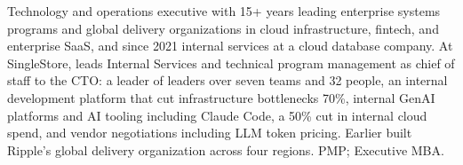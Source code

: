 \documentclass[11pt,letterpaper,sans]{moderncv}
\begin{document}
\makecvtitle




\vspace{6pt}
\small{Technology and operations executive with 15+ years leading enterprise systems programs and global delivery organizations in cloud infrastructure, fintech, and enterprise SaaS, and since 2021 internal services at a cloud database company. At SingleStore, leads Internal Services and technical program management as chief of staff to the CTO: a leader of leaders over seven teams and 32 people, an internal development platform that cut infrastructure bottlenecks 70\%, internal GenAI platforms and AI tooling including Claude Code, a 50\% cut in internal cloud spend, and vendor negotiations including LLM token pricing. Earlier built Ripple's global delivery organization across four regions. PMP; Executive MBA.}

\end{document}
